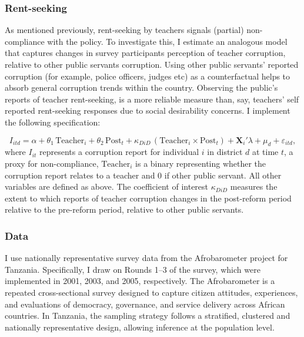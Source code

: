 \documentclass[hidelinks,12pt]{article}
\begin{document}
\begin{singlespace}
\subsubsection{Rent-seeking}
As mentioned previously, rent-seeking by teachers signals (partial) non-compliance with the policy. To investigate this, I estimate an analogous model that captures changes in survey participants perception of teacher corruption, relative to other public servants corruption. Using other public servants' reported corruption (for example, police officers, judges etc) as a counterfactual helps to absorb general corruption trends within the country. Observing the public's reports of teacher rent-seeking, is a more reliable measure than, say, teachers' self reported rent-seeking responses due to social desirability concerns. I implement the following specification:  
\vspace{-1.5em}

\begin{equation} \label{eq:rentseeking}
    I_{itd} = \alpha + \theta_1 \, \text{Teacher}_{i} 
    + \theta_2 \, \text{Post}_{t} 
    + \kappa_{DiD} \, (\text{Teacher}_{i} \times \text{Post}_{t})
    + \mathbf{X}_{i}' \lambda 
    + \mu_{d} + \varepsilon_{itd},
\end{equation}
where $I_{it}$ represents a corruption report for individual $i$ in district $d$ at time $t$, a proxy for non-compliance, $\text{Teacher}_{i}$ is a binary representing whether the corruption report relates to a teacher and 0 if other public servant. All other variables are defined as above. The coefficient of interest $\kappa_{DiD}$ measures the extent to which reports of teacher corruption changes in the post-reform period relative to the pre-reform period, relative to other public servants.

\subsubsection{Data}
I use nationally representative survey data from the Afrobarometer project for Tanzania. Specifically, I draw on Rounds 1--3 of the survey, which were implemented in 2001, 2003, and 2005, respectively. The Afrobarometer is a repeated cross-sectional survey designed to capture citizen attitudes, experiences, and evaluations of democracy, governance, and service delivery across African countries. In Tanzania, the sampling strategy follows a stratified, clustered and nationally representative design, allowing inference at the population level.  


\end{singlespace}
\end{document}
